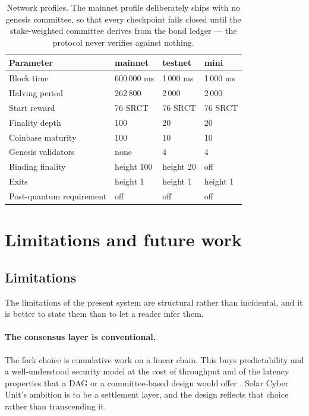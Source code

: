 \documentclass{article}
\begin{document}
\begin{table}[t]
\centering
\begin{tabular}{llll}
\toprule
\textbf{Parameter} & \textbf{mainnet} & \textbf{testnet} & \textbf{mini} \\
\midrule
Block time & 600\,000 ms & 1\,000 ms & 1\,000 ms \\
Halving period & 262\,800 & 2\,000 & 2\,000 \\
Start reward & 76 SRCT & 76 SRCT & 76 SRCT \\
Finality depth & 100 & 20 & 20 \\
Coinbase maturity & 100 & 10 & 10 \\
Genesis validators & none & 4 & 4 \\
Binding finality & height 100 & height 20 & off \\
Exits & height 1 & height 1 & height 1 \\
Post-quantum requirement & off & off & off \\
\bottomrule
\end{tabular}
\caption{Network profiles. The mainnet profile deliberately ships with no
genesis committee, so that every checkpoint fails closed until the
stake-weighted committee derives from the bond ledger --- the protocol never
verifies against nothing.}
\label{tab:profiles}
\end{table}


\section{Limitations and future work}
\label{sec:future}

\subsection{Limitations}

The limitations of the present system are structural rather than incidental,
and it is better to state them than to let a reader infer them.

\paragraph{The consensus layer is conventional.} The fork choice is cumulative
work on a linear chain. This buys predictability and a well-understood security
model at the cost of throughput and of the latency properties that a DAG or a
committee-based design would offer \cite{eyal2014securitybitcoin,trivedi2017sok}.
Solar Cyber Unit's ambition is to be a settlement layer, and the design reflects that
choice rather than transcending it.
\end{document}
